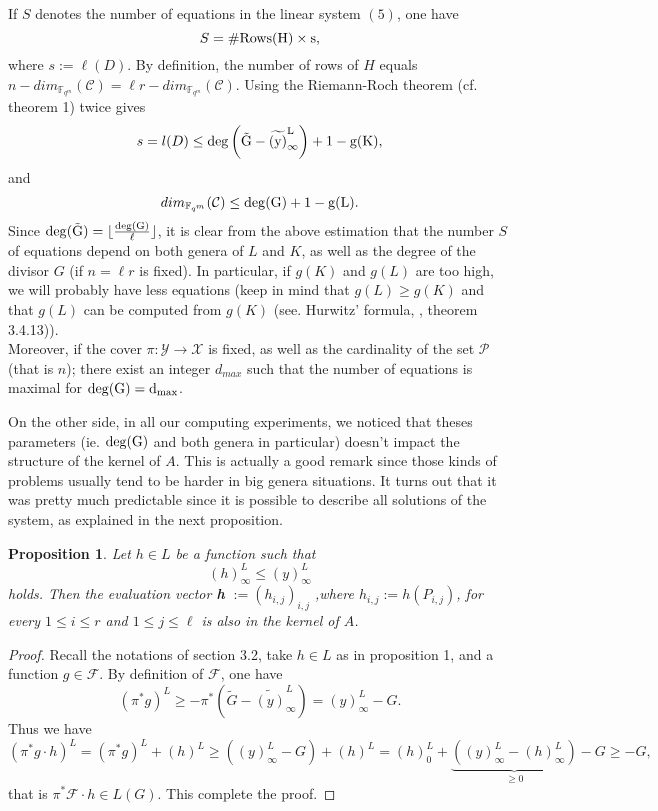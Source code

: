 \documentclass[10pt]{article}
\newtheorem{prop1}{Proposition}[]
\newcommand{\s}{\vspace{0.3cm}}
\newcommand{\cd}{\cdot}
\newcommand{\fqm}{\mathbb{F}_{q^m}}
\newcommand{\X}{\mathcal{X}}
\newcommand{\Y}{\mathcal{Y}}
\newcommand{\PR}{\mathcal{P}}
\begin{document}
\s 

If $S$ denotes the number of equations in the linear system $(5)$, one have 
\[S = \#\rm{Rows}(H) \times s,\]
where $s := \ell(D)$. By definition, the number of rows of $H$ equals $n-dim_{\fqm}(\mathcal{C})= \ell r - dim_{\fqm}(\mathcal{C})$. Using the Riemann-Roch theorem (cf. theorem 1) twice gives 
\[s = l(D) \leq \rm{deg}\left(\tilde{G}-\widetilde{(y)}^L_{\infty}\right) +1 - g(K) ,\]
and
\[dim_{\fqm}(\mathcal{C}) \leq \rm{deg}(G)+1-g(L).\]
Since $\rm{deg}(\tilde{G}) = \lfloor \frac{\rm{deg}(G)}{\ell} \rfloor$, it is clear from the above estimation that the number $S$ of equations depend on both genera of $L$ and $K$, as well as the degree of the divisor $G$ (if $n=\ell r$ is fixed). In particular, if $g(K)$ and $g(L)$ are too high, we will probably have less equations (keep in mind that $g(L) \geq g(K)$ and that $g(L)$ can be computed from $g(K)$ (see. Hurwitz' formula, \cite{Sti}, theorem 3.4.13)). \\
Moreover, if the cover $\pi : \Y \rightarrow \X$ is fixed, as well as the cardinality of the set $\PR$ (that is $n$); there exist an integer $d_{max}$ such that the number of equations is maximal for $\rm{deg}(G)=d_{max}$. 

\s

On the other side, in all our computing experiments, we noticed that theses parameters (ie. $\rm{deg}(G)$ and both genera in particular) doesn't impact the structure of the kernel of $A$. This is actually a good remark since those kinds of problems usually tend to be harder in big genera situations. It turns out that it was pretty much predictable since it is possible to describe all solutions of the system, as explained in the next proposition. 

\s

\begin{prop1}
Let $h \in L$ be a function such that 
\[ (h)^L_{\infty} \leq (y)^L_{\infty}\]
holds. Then the evaluation vector \textbf{h} $ := (h_{i,j})_{i,j}$ ,where $h_{i,j} := h(P_{i,j})$, for every $1 \leq i \leq r$ and $1 \leq j \leq \ell$ is also in the kernel of $A$.
\end{prop1}

\s

\begin{proof}
Recall the notations of section 3.2, take $h \in L$ as in proposition 1, and a function $g \in \mathcal{F}$. By definition of $\mathcal{F}$, one have 
\[(\pi^*g)^L \geq -\pi^*\left(\tilde{G}-\widetilde{(y)}^L_{\infty}\right) = (y)^L_{\infty} - G.\]
Thus we have 
\[(\pi^*g \cd h)^L = (\pi^*g)^L  + (h)^L \geq  ((y)^L_{\infty} - G)+(h)^L = (h)^L_0 + \underbrace{((y)^L_{\infty}-(h)^L_{\infty})}_{\geq 0} - G \geq -G,\]
that is $\pi^*\mathcal{F}\cd h \in L(G)$. This complete the proof.

\end{proof}
\end{document}
